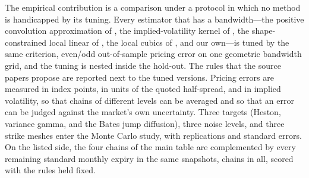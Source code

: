 \documentclass[preprint,12pt,authoryear,times]{elsarticle}
\begin{document}
The empirical contribution is a comparison under a protocol in which no method is handicapped by its tuning. Every estimator that has a bandwidth---the positive convolution approximation of \citeauthor{bondarenko2003}, the implied-volatility kernel of \citet{aitsahalia1998}, the shape-constrained local linear of \citet{aitsahalia2003}, the local cubics of \citet{grith2012}, and our own---is tuned by the same criterion, even/odd out-of-sample pricing error on one geometric bandwidth grid, and the tuning is nested inside the hold-out. The rules that the source papers propose are reported next to the tuned versions. Pricing errors are measured in index points, in units of the quoted half-spread, and in implied volatility, so that chains of different levels can be averaged and so that an error can be judged against the market's own uncertainty. Three targets (Heston, variance gamma, and the Bates jump diffusion), three noise levels, and three strike meshes enter the Monte Carlo study, with \mcrepsmain{} replications and standard errors. On the listed side, the four chains of the main table are complemented by every remaining standard monthly expiry in the same snapshots, \nextra{} chains in all, scored with the rules held fixed.
\end{document}
